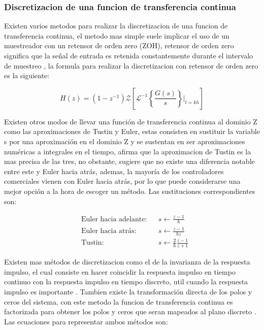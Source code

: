         \subsubsection{Discretizacion de una funcion de transferencia continua}
            
            Existen varios metodos para realizar la discretizacion de una funcion de transferencia continua, el metodo mas simple suele implicar el uso de un muestreador con un retensor de orden zero (ZOH), retensor de orden zero significa que la señal de entrada es retenida constantemente durante el intervalo de muestreo \Parencite{haugen2005discrete}, la formula para realizar la discretizacion con retensor de orden zero es la siguiente:

            \begin{equation}\label{eq:ZOH}
                H(z) = (1 - z^{-1}) \mathcal{Z} \left[ \mathcal{L}^{-1}\left\lbrace \frac{G(s)}{s}\right\rbrace\Bigr|_{t=kh}\right]
            \end{equation}

            Existen otros modos de llevar una función de transferencia continua al dominio Z como las aproximaciones de Tustin y Euler, estas consisten en sustituir la variable s por una aproximación en el dominio Z y se sustentan en ser aproximaciones numéricas a integrales en el tiempo, \textcite{haugen2005discrete} afirma que la aproximacion de Tustin es la mas precisa de las tres, no obstante, sugiere que no existe una diferencia notable entre este y Euler hacia atrás, ademas, la mayoría de los controladores comerciales vienen con Euler hacia atrás, por lo que puede considerarse una mejor opción a la hora de escoger un método. Las sustituciones correspondientes son:

            \begin{align}
                &\text{Euler hacia adelante:}& &s \leftarrow \frac{z - 1}{h} \label{eq:eulerF}\\
                &\text{Euler hacia atrás:}& &s \leftarrow \frac{z - 1}{hz} \label{eq:eulerB}\\
                &\text{Tustin:}& &s \leftarrow \frac{2}{h} \frac{z-1}{z+1} \label{eq:tustin}
            \end{align}

            Existen mas métodos de discretizacion como el de la invarianza de la respuesta impulso, el cual consiste en hacer coincidir la respuesta impulso en tiempo continuo con la respuesta impulso en tiempo discreto, util cuando la respuesta impulso es importante \Parencite{fernandez2013control}. Tambien existe la transformación directa de los polos y ceros del sistema, con este metodo la funcion de transferencia continua es factorizada para obtener los polos y ceros que seran mapeados al plano discreto \Parencite{hori1992matched}. Las ecuaciones para representar ambos métodos son:

